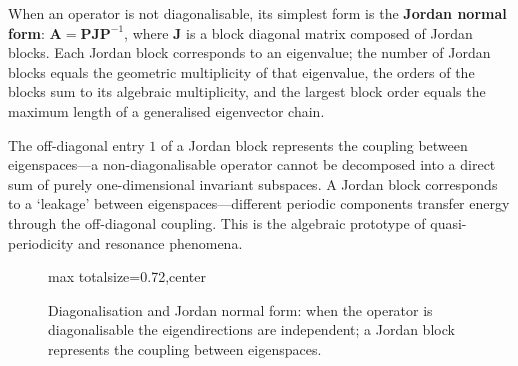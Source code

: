 \begin{definition}\label{def:jordan_form}
When an operator is not diagonalisable, its simplest form is the \textbf{Jordan normal form}: $\mathbf{A} = \mathbf{P} \mathbf{J} \mathbf{P}^{-1}$, where $\mathbf{J}$ is a block diagonal matrix composed of Jordan blocks. Each Jordan block corresponds to an eigenvalue; the number of Jordan blocks equals the geometric multiplicity of that eigenvalue, the orders of the blocks sum to its algebraic multiplicity, and the largest block order equals the maximum length of a generalised eigenvector chain.

The off-diagonal entry $1$ of a Jordan block represents the coupling between eigenspaces---a non-diagonalisable operator cannot be decomposed into a direct sum of purely one-dimensional invariant subspaces. A Jordan block corresponds to a `leakage' between eigenspaces---different periodic components transfer energy through the off-diagonal coupling. This is the algebraic prototype of quasi-periodicity and resonance phenomena.
\end{definition}

\begin{figure}[htbp]
\centering
\begin{adjustbox}{max totalsize={\linewidth}{0.72\textheight},center}
\end{adjustbox}
\caption{Diagonalisation and Jordan normal form: when the operator is diagonalisable the eigendirections are independent; a Jordan block represents the coupling between eigenspaces.}
\label{fig:diagonal_jordan}
\end{figure}


